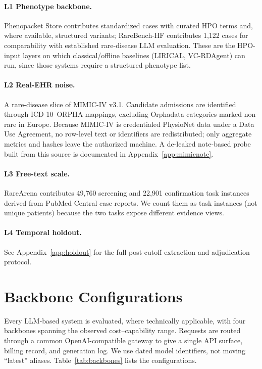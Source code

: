 \documentclass[letterpaper]{article} %
\begin{document}
\paragraph{L1 Phenotype backbone.}
Phenopacket Store contributes standardized cases with curated HPO terms and,
where available, structured variants; RareBench-HF contributes 1,122 cases for
comparability with established rare-disease LLM evaluation. These are the
HPO-input layers on which classical/offline baselines (LIRICAL, VC-RDAgent) can
run, since those systems require a structured phenotype list.

\paragraph{L2 Real-EHR noise.}
A rare-disease slice of MIMIC-IV v3.1. Candidate admissions are identified
through ICD-10--ORPHA mappings, excluding Orphadata categories marked non-rare
in Europe. Because MIMIC-IV is credentialed PhysioNet data under a Data Use
Agreement, no row-level text or identifiers are redistributed; only aggregate
metrics and hashes leave the authorized machine. A de-leaked note-based probe
built from this source is documented in Appendix~\ref{app:mimicnote}.

\paragraph{L3 Free-text scale.}
RareArena contributes 49,760 screening and 22,901 confirmation task instances
derived from PubMed Central case reports. We count them as task instances (not
unique patients) because the two tasks expose different evidence views.

\paragraph{L4 Temporal holdout.}
See Appendix~\ref{app:holdout} for the full post-cutoff extraction and
adjudication protocol.

\section{Backbone Configurations}
\label{app:backbones}

Every LLM-based system is evaluated, where technically applicable, with four
backbones spanning the observed cost--capability range. Requests are routed
through a common OpenAI-compatible gateway to give a single API surface,
billing record, and generation log. We use dated model identifiers, not moving
``latest'' aliases. Table~\ref{tab:backbones} lists the configurations.
\end{document}
